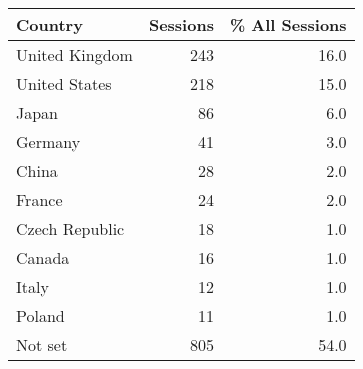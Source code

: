\begin{tabular}{lrr}
\toprule
Country &  Sessions &  \% All Sessions \\
\midrule
United Kingdom &       243 &            16.0 \\
United States  &       218 &            15.0 \\
Japan          &        86 &             6.0 \\
Germany        &        41 &             3.0 \\
China          &        28 &             2.0 \\
France         &        24 &             2.0 \\
Czech Republic &        18 &             1.0 \\
Canada         &        16 &             1.0 \\
Italy          &        12 &             1.0 \\
Poland         &        11 &             1.0 \\
Not set        &       805 &            54.0 \\
\bottomrule
\end{tabular}
